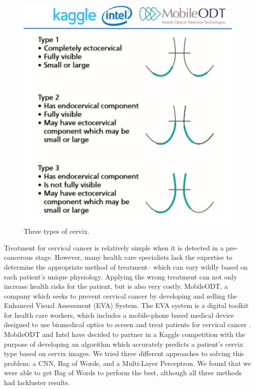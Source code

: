 \documentclass{article}
\begin{document}
\begin{figure}[ht]
  \vskip 0.2in
  \begin{center}
  \centerline{\includegraphics[width=\columnwidth]{cervixtype}}
  \caption {Three types of cervix.}
  \label{three}
  \end{center}
  \vskip -0.2in
\end{figure}

Treatment for cervical cancer is relatively simple when it is detected
in a pre-cancerous stage. However, many health care specialists lack
the expertise to determine the appropriate method of treatment-- which
can vary wildly based on each patient’s unique physiology. Applying
the wrong treatment can not only increase health risks for the
patient, but is also very costly. MobileODT, a company which seeks to
prevent cervical cancer by developing and selling the Enhanced Visual
Assessment (EVA) System. The EVA system is a digital toolkit for
health care workers, which includes a mobile-phone based medical
device designed to use biomedical optics to screen and treat patients
for cervical cancer \cite{kaggle}. MobileODT and Intel have decided to
partner in a Kaggle competition with the purpose of developing an
algorithm which accurately predicts a patient’s cervix type based on
cervix images. We tried three different approaches to solving this
problem: a CNN, Bag of Words, and a Multi-Layer Perceptron. We found that we were able to get Bag of Words to perform the best, although all three methods had lackluster results.
\end{document}
